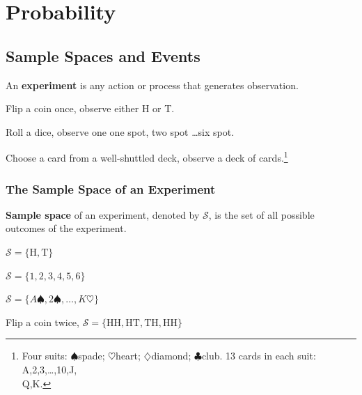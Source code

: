 \chapter{Probability}
\section{Sample Spaces and Events}

\begin{defn}
  An \textbf{experiment} is any action or process that generates observation.
\end{defn}

\begin{exmp}
  Flip a coin once, observe either H or T.
\end{exmp}

\begin{exmp}
  Roll a dice, observe one one spot, two spot \dots six spot.
\end{exmp}

\begin{exmp}
  Choose a card from a well-shuttled deck, observe a deck of cards.\footnote{Four suits: $\spadesuit$spade; $\heartsuit$heart; $\diamondsuit$diamond; $\clubsuit$club. 13 cards in each suit: A,2,3,\dots,10,J,\\Q,K.}
\end{exmp}

\subsection{The Sample Space of an Experiment}
\begin{defn}
  \textbf{Sample space} of an experiment, denoted by $\mathcal{S}$, is the set of all possible outcomes of the experiment.
\end{defn}

\begin{exmp}
  $\mathcal{S}=\{\text{H},\text{T}\}$
\end{exmp}

\begin{exmp}
  $\mathcal{S}=\{1,2,3,4,5,6\}$
\end{exmp}

\begin{exmp}
  $\mathcal{S}=\{A\spadesuit,2\spadesuit ,\dots, K\heartsuit\}$
\end{exmp}

\begin{exmp}
  Flip a coin twice, $\mathcal{S}=\{\text{HH},\text{HT},\text{TH},\text{HH}\}$
\end{exmp}

